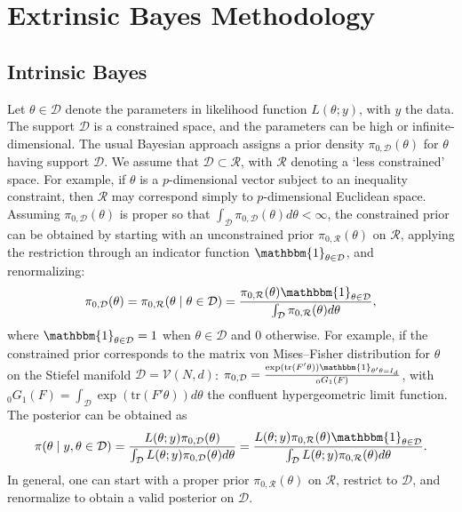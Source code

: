 \documentclass[10pt]{article}
\newcommand{\mc}[1]{\mathcal{#1}}
\DeclareMathOperator{\1}{\mathbbm{1}}
\begin{document}
\section{Extrinsic Bayes Methodology}
\subsection{Intrinsic Bayes}
Let $\theta \in \mc D$ denote the parameters in likelihood function $L(\theta;y)$, with $y$ the data. The support $\mc D$ is a constrained space, and the parameters can be high or infinite-dimensional. The usual Bayesian approach assigns a prior density $\pi_{0,\mc D}(\theta)$ for $\theta$ having support $\mc D$. We assume that $\mc D \subset \mc R$, with $\mc R$ denoting a `less constrained' space. For example, if $\theta$ is a $p$-dimensional vector subject to an inequality constraint, then $\mc R$ may correspond simply to $p$-dimensional Euclidean space.
Assuming $\pi_{0,\mc D}(\theta)$ is proper so that $\int_{\mc D} \pi_{0,\mc D}(\theta) d\theta <\infty$, the constrained prior can be obtained by starting with an unconstrained prior $\pi_{0,\mc R}(\theta)$ on $\mc R$, applying the restriction through an indicator function $\mathbbm{1}_{\theta\in \mc D}$, and renormalizing:
\begin{equation}
\begin{aligned}
\label{exact_prior}
\pi_{0,\mc D}(\theta)= \pi_{0,\mc R}(\theta \mid \theta \in \mc D) = \frac{ \pi_{0,\mc R}(\theta) \mathbbm{1}_{\theta\in \mc D} }{ \int_{\mc D} \pi_{0,\mc R}(\theta)d\theta },
\end{aligned}
\end{equation}
where $\mathbbm{1}_{\theta \in \mc D}=1$ when $\theta \in \mc D$ and $0$ otherwise. For example, if the constrained prior corresponds to the matrix von Mises--Fisher distribution for $\theta$ on the Stiefel manifold $\mc D=\mc V(N,d)$: $\pi_{0,\mc D}=\frac{\exp(\text{tr}(F'\theta))\mathbbm{1}_{\theta'\theta=I_d}}{_0G_1(F)}$, with $_0G_1(F)= \int_{\mc D} \exp(\text{tr}(F'\theta)) d\theta$ the confluent hypergeometric limit function.
The posterior can be obtained as
\begin{equation}
\begin{aligned}
\label{exact_posterior}
\pi(\theta \mid y, \theta \in \mc D) = \frac{ L(\theta;y)\pi_{0,\mc D}(\theta)}{\int_{\mc D} L(\theta;y)\pi_{0,\mc D}(\theta) d\theta } = \frac{ L(\theta;y)\pi_{0,\mc R}(\theta) \mathbbm{1}_{\theta\in \mc D} }{\int_{\mc D} L(\theta;y)\pi_{0,\mc R}(\theta) d\theta }.
\end{aligned}
\end{equation}
In general, one can start with a proper prior $\pi_{0,\mc R}(\theta)$ on $\mc R$, restrict to $\mc D$, and renormalize to obtain a valid posterior on $\mc D$.
\end{document}
